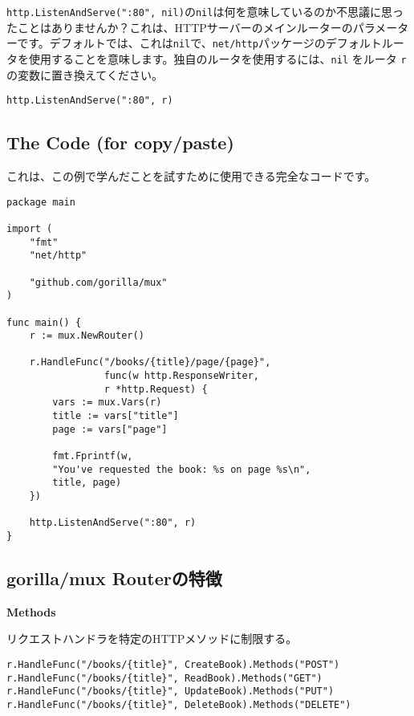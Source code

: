 \texttt{http.ListenAndServe(":80", nil)}の\texttt{nil}は何を意味しているのか不思議に思ったことはありませんか？これは、HTTPサーバーのメインルーターのパラメーターです。デフォルトでは、これは\texttt{nil}で、\texttt{net/http}パッケージのデフォルトルータを使用することを意味します。独自のルータを使用するには、\texttt{nil} をルータ \texttt{r} の変数に置き換えてください。

\begin{lstlisting}[numbers=none]
http.ListenAndServe(":80", r)
\end{lstlisting}

\subsection{The Code (for copy/paste)}

これは、この例で学んだことを試すために使用できる完全なコードです。


\begin{lstlisting}[numbers=none]
package main

import (
    "fmt"
    "net/http"

    "github.com/gorilla/mux"
)

func main() {
    r := mux.NewRouter()

    r.HandleFunc("/books/{title}/page/{page}",
                 func(w http.ResponseWriter,
                 r *http.Request) {
        vars := mux.Vars(r)
        title := vars["title"]
        page := vars["page"]

        fmt.Fprintf(w,
        "You've requested the book: %s on page %s\n",
        title, page)
    })

    http.ListenAndServe(":80", r)
}
\end{lstlisting}

\subsection{gorilla/mux Routerの特徴}

\textbf{Methods}

リクエストハンドラを特定のHTTPメソッドに制限する。


\begin{lstlisting}[numbers=none]
r.HandleFunc("/books/{title}", CreateBook).Methods("POST")
r.HandleFunc("/books/{title}", ReadBook).Methods("GET")
r.HandleFunc("/books/{title}", UpdateBook).Methods("PUT")
r.HandleFunc("/books/{title}", DeleteBook).Methods("DELETE")
\end{lstlisting}


